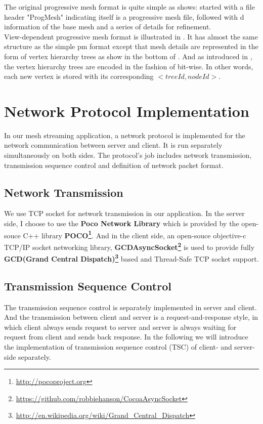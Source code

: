The original progressive mesh format is quite simple as  shows: started with a file header "ProgMesh" indicating itself is a progressive mesh file, followed with d information of the base mesh and a series of details for refinement. \\

View-dependent progressive mesh format is illustrated in . It has almost the same structure as the simple pm format except that mesh details are represented in the form of vertex hierarchy trees as show in the bottom of . And as introduced in , the vertex hierarchy trees are encoded in the fashion of bit-wise. In other words, each new vertex is stored with its corresponding $<treeId, nodeId>$.

\section{Network Protocol Implementation}
\label{section:networkprotocol}
In our mesh streaming application, a network protocol is implemented for the network communication between server and client. It is run separately simultaneously on both sides. The protocol's job includes network transmission, transmission sequence control and definition of network packet format. 

\subsection{Network Transmission}
\label{section:networktransmission}
We use TCP socket for network transmission in our application. In the server side, I choose to use the \textbf{Poco Network Library} which is provided by the open-souce C++ library \textbf{POCO\footnote{\label{POCO}\url{http://pocoproject.org}}}. And in the client side, an open-souce objective-c TCP/IP socket networking library, \textbf{GCDAsyncSocket\footnote{\label{GCDAsyncSocket}\url{https://github.com/robbiehanson/CocoaAsyncSocket}}} is used to provide fully \textbf{GCD(Grand Central Dispatch)\footnote{\label{gcd}\url{http://en.wikipedia.org/wiki/Grand_Central_Dispatch}}} based and Thread-Safe TCP socket support. 

\subsection{Transmission Sequence Control}
\label{section:transeqcontrol}
The transmission sequence control is separately implemented in server and client. And the transmission between client and server is a request-and-response style, in which client always sends request to server and server is always waiting for request from client and sends back response. In the following we will introduce the implementation of transmission sequence control (TSC) of client- and server-side separately. 

